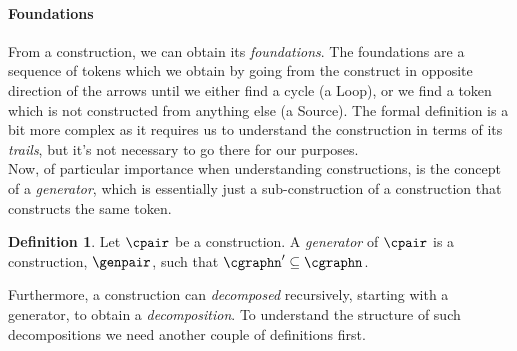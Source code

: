 \documentclass[a4paper]{article}
\theoremstyle{definition}
\newtheorem{definition}{Definition}
\begin{document}
		\paragraph{Foundations} From a construction, we can obtain its \textit{foundations}. The foundations are a sequence of tokens which we obtain by going from the construct in opposite direction of the arrows until we either find a cycle (a Loop), or we find a token which is not constructed from anything else (a Source). The formal definition is a bit more complex as it requires us to understand the construction in terms of its \textit{trails}, but it's not necessary to go there for our purposes.\\

		Now, of particular importance when understanding constructions, is the concept of a \textit{generator}, which is essentially just a sub-construction of a construction that constructs the same token.
		
		\begin{definition}
			Let $\cpair$ be a construction. A \textit{generator} of $\cpair$ is a construction, $\genpair$, such that $\cgraphn'\subseteq \cgraphn$.
		\end{definition}
	
%	
%	
	
		Furthermore, a construction can \textit{decomposed} recursively, starting with a generator, to obtain a \textit{decomposition}. To understand the structure of such decompositions we need another couple of definitions first.
	
\end{document}
